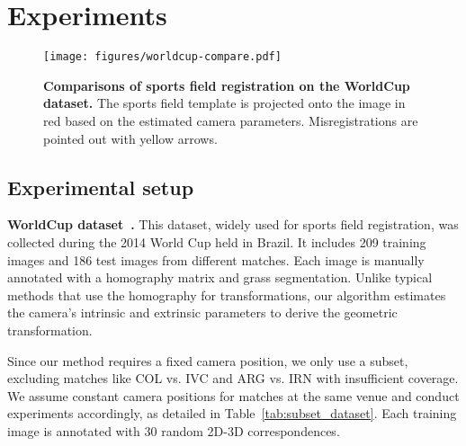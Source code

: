 \section{Experiments}


\begin{figure*}[!t]
    \centering
    \texttt{[image: figures/worldcup-compare.pdf]}
    \caption{\textbf{Comparisons of sports field registration on the WorldCup dataset.} The sports field template is projected onto the image in red based on the estimated camera parameters. Misregistrations are pointed out with yellow arrows.}
    \label{fig:worldcup-compare}
\end{figure*}

\subsection{Experimental setup}

\textbf{WorldCup dataset~\cite{homayounfar2017sports}.}
This dataset, widely used for sports field registration, was collected during the 2014 World Cup held in Brazil. It includes 209 training images and 186 test images from different matches. Each image is manually annotated with a homography matrix and grass segmentation. Unlike typical methods that use the homography for transformations, our algorithm estimates the camera's intrinsic and extrinsic parameters to derive the geometric transformation.

Since our method requires a fixed camera position, we only use a subset, excluding matches like COL vs. IVC and ARG vs. IRN with insufficient coverage. We assume constant camera positions for matches at the same venue and conduct experiments accordingly, as detailed in Table~\ref{tab:subset_dataset}. Each training image is annotated with 30 random 2D-3D correspondences.

